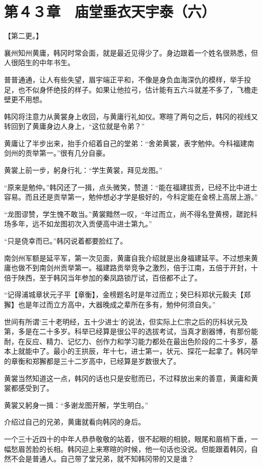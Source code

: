 \section{第４３章　庙堂垂衣天宇泰（六）}

【第二更。】

襄州知州黄庸，韩冈时常会面，就是最近见得少了。身边跟着一个姓名很熟悉，但人很陌生的中年书生。

普普通通，让人有些失望，眉宇端正平和，不像是身负血海深仇的模样，举手投足，也不似身怀绝技的样子。如果让他拉弓，估计能有五六斗就差不多了，飞檐走壁更不用想。

韩冈将注意力从黄裳身上收回，与黄庸行礼如仪。寒暄了两句之后，韩冈的视线又转回到了黄庸身边人身上，“这位就是令弟？”

黄庸让了半步出来，抬手介绍着自己的堂弟：“舍弟黄裳，表字勉仲。今科福建南剑州的贡举第一。”很有几分自豪。

黄裳上前一步，躬身行礼：“学生黄裳，拜见龙图。”

“原来是勉仲。”韩冈还了一揖，点头微笑，赞道：“能在福建拔贡，已经不比中进士容易。而且还是贡举第一，勉仲想必才学是极好的，今科定能在金榜上高居上游。”

“龙图谬赞，学生愧不敢当。”黄裳黯然一叹，“年过而立，尚不得名登黄榜，蹉跎科场多年，远不如龙图初次入贡便高中进士第九。”

“只是侥幸而已。”韩冈说着都要脸红了。

南剑州军额是延平军，第一次见面，黄庸自我介绍就是出身福建延平。不过想来黄庸也做不到南剑州贡举第一。福建路贡举竞争之激烈，倍于江南，五倍于开封，十倍于陕西，至于韩冈当年参加的秦凤路锁厅试，百倍都不止了。

“记得浦城章状元子平【章衡】，金榜题名时是年过而立；癸巳科郑状元毅夫【郑獬】也是年过而立方高中，大器晚成之辈所在多有，勉仲何须自失。”

世间有所谓‘三十老明经，五十少进士’的说法，但实际上仁宗之后的历科状元及第，多是在二十多岁。科举已经算是很公平的选拔考试，当真才剧器博，有那份能耐，在反应、精力、记忆力、创作力和学习能力都处在最出色阶段的二十多岁，基本上就能中了。最小的王拱辰，年十七，进士第一，状元、探花一起拿了。韩冈举的章衡和郑獬都是三十二岁高中，已经算是岁数很大了。

黄裳当然知道这一点，韩冈的话也只是安慰而已，不过释放出来的善意，黄庸和黄裳都感受到了。

黄裳又躬身一揖：“多谢龙图开解，学生明白。”

介绍过自己的兄弟，黄庸就看向韩冈的身后。

一个三十近四十的中年人恭恭敬敬的站着，很不起眼的相貌，眼尾和眉梢下垂，一幅愁眉苦脸的长相。韩冈迎上来寒暄的时候，他一句话也没说。但能跟着韩冈，自然不会是普通人。自己带了堂兄弟，就不知韩冈带的又是谁？

